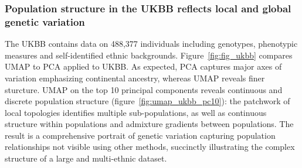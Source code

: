 \documentclass[12pt]{pnas-new}
\begin{document}
\subsubsection*{Population structure in the UKBB reflects local and global genetic variation} 
The UKBB contains data on 488,377 individuals including genotypes, phenotypic measures and self-identified ethnic backgrounds. Figure~\ref{fig:fig_ukbb} compares UMAP to PCA applied to UKBB. As expected, PCA captures major axes of variation emphasizing continental ancestry, whereas UMAP reveals finer sturcture. UMAP on the top 10 principal components reveals continuous and discrete population structure (figure~\ref{fig:umap_ukbb_pc10}): the patchwork of local topologies identifies multiple sub-populations, as well as continuous structure within populations and admixture gradients between populations. The result is a comprehensive portrait of genetic variation capturing population relationships not visible using other methods, succinctly illustrating the complex structure of a large and multi-ethnic dataset.
\end{document}
